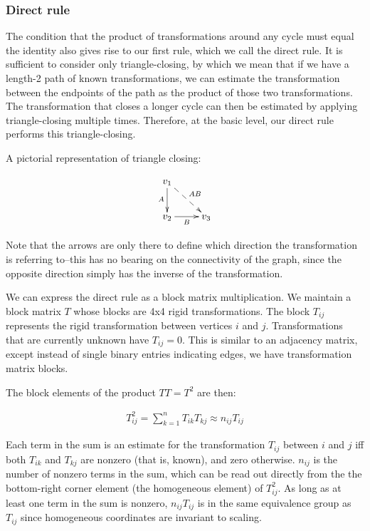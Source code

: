 \subsubsection{Direct rule}

The condition that the product of transformations around any cycle must equal the identity also gives rise
to our first rule, which we call the direct rule. It is sufficient to consider
only triangle-closing, by which we mean that if we have a length-2 path of known transformations, we
can estimate the transformation between the endpoints of the path as the product of those two transformations.
The transformation that closes a longer cycle can then be estimated by applying triangle-closing 
multiple times. Therefore, at the basic level, our direct rule performs this triangle-closing.

A pictorial representation of triangle closing:

\begin{align}
	\xymatrix{
	v_1 \ar[d]_A \ar@{-->}[dr]^{AB} & \\
	v_2 \ar[r]_B & v_3 
	}
\end{align}

Note that the arrows are only there to define which direction the transformation is referring to--this
has no bearing on the connectivity of the graph, since the opposite direction simply has the 
inverse of the transformation.

We can express the direct rule as a block matrix multiplication. We maintain a block matrix $T$ whose
blocks are 4x4 rigid transformations. The block $T_{ij}$ represents the rigid transformation
between vertices $i$ and $j$. Transformations that are currently unknown have $T_{ij} = 0$.
This is similar to an adjacency matrix, except instead of single binary entries indicating edges,
we have transformation matrix blocks.

The block elements of the product $T T = T^2$ are then:

\begin{align}
	T^2_{ij} = \sum_{k = 1}^n T_{ik} T_{kj} \approx n_{ij} T_{ij}
\end{align}

Each term in the sum is an estimate for the transformation $T_{ij}$ between $i$ and $j$ iff both 
$T_{ik}$ and $T_{kj}$ are nonzero (that is, known), and zero otherwise. 
$n_{ij}$ is the number of nonzero terms in the sum, 
which can be read out directly from the 
the bottom-right corner element (the homogeneous element) of $T^2_{ij}$. 
As long as at least one term in the sum is nonzero, 
$n_{ij} T_{ij}$ is in the same equivalence group as $T_{ij}$ since homogeneous coordinates are invariant 
to scaling.

